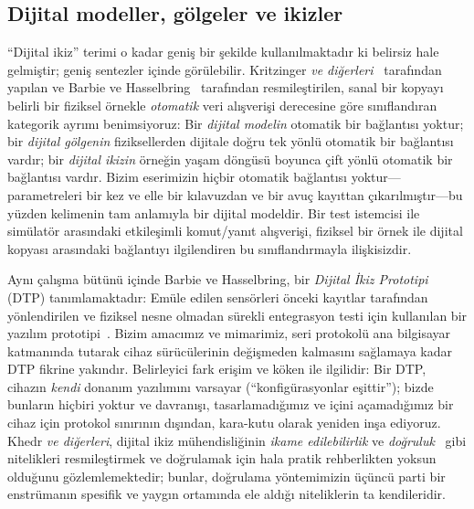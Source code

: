 \documentclass[conference]{IEEEtran}
\begin{document}
\subsection{Dijital modeller, gölgeler ve ikizler}
``Dijital ikiz'' terimi o kadar geniş bir şekilde kullanılmaktadır ki belirsiz hale gelmiştir; geniş sentezler \cite{tao2019dt,rasheed2020dt} içinde görülebilir. Kritzinger \emph{ve diğerleri}~\cite{kritzinger2018dt} tarafından yapılan ve Barbie ve Hasselbring~\cite{barbie2024dtp} tarafından resmileştirilen, sanal bir kopyayı belirli bir fiziksel örnekle \emph{otomatik} veri alışverişi derecesine göre sınıflandıran kategorik ayrımı benimsiyoruz: Bir \emph{dijital modelin} otomatik bir bağlantısı yoktur; bir \emph{dijital gölgenin} fiziksellerden dijitale doğru tek yönlü otomatik bir bağlantısı vardır; bir \emph{dijital ikizin} örneğin yaşam döngüsü boyunca çift yönlü otomatik bir bağlantısı vardır. Bizim eserimizin hiçbir otomatik bağlantısı yoktur---parametreleri bir kez ve elle bir kılavuzdan ve bir avuç kayıttan çıkarılmıştır---bu yüzden kelimenin tam anlamıyla bir dijital modeldir. Bir test istemcisi ile simülatör arasındaki etkileşimli komut/yanıt alışverişi, fiziksel bir örnek ile dijital kopyası arasındaki bağlantıyı ilgilendiren bu sınıflandırmayla ilişkisizdir.

Aynı çalışma bütünü içinde Barbie ve Hasselbring, bir \emph{Dijital İkiz Prototipi} (DTP) tanımlamaktadır: Emüle edilen sensörleri önceki kayıtlar tarafından yönlendirilen ve fiziksel nesne olmadan sürekli entegrasyon testi için kullanılan bir yazılım prototipi~\cite{barbie2024dtp,barbie2023smartfarming}. Bizim amacımız ve mimarimiz, seri protokolü ana bilgisayar katmanında tutarak cihaz sürücülerinin değişmeden kalmasını sağlamaya kadar DTP fikrine yakındır. Belirleyici fark erişim ve köken ile ilgilidir: Bir DTP, cihazın \emph{kendi} donanım yazılımını varsayar (``konfigürasyonlar eşittir''); bizde bunların hiçbiri yoktur ve davranışı, tasarlamadığımız ve içini açamadığımız bir cihaz için protokol sınırının dışından, kara-kutu olarak yeniden inşa ediyoruz. Khedr \emph{ve diğerleri}, dijital ikiz mühendisliğinin \emph{ikame edilebilirlik} ve \emph{doğruluk}~\cite{khedr2026sos} gibi nitelikleri resmileştirmek ve doğrulamak için hala pratik rehberlikten yoksun olduğunu gözlemlemektedir; bunlar, doğrulama yöntemimizin üçüncü parti bir enstrümanın spesifik ve yaygın ortamında ele aldığı niteliklerin ta kendileridir.
\end{document}
